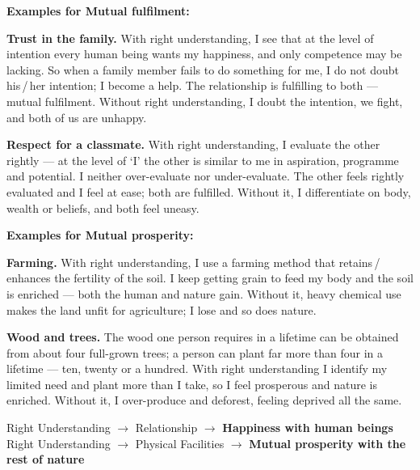 \textbf{Examples for Mutual fulfilment:}
\begin{apts}
\item \textbf{Trust in the family.} With right understanding, I see that at
      the level of intention every human being wants my happiness, and only
      competence may be lacking. So when a family member fails to do something
      for me, I do not doubt his\,/\,her intention; I become a help. The
      relationship is fulfilling to both --- mutual fulfilment. Without right
      understanding, I doubt the intention, we fight, and both of us are
      unhappy.
\item \textbf{Respect for a classmate.} With right understanding, I evaluate
      the other rightly --- at the level of `I' the other is similar to me in
      aspiration, programme and potential. I neither over-evaluate nor
      under-evaluate. The other feels rightly evaluated and I feel at ease;
      both are fulfilled. Without it, I differentiate on body, wealth or
      beliefs, and both feel uneasy.
\end{apts}

\textbf{Examples for Mutual prosperity:}
\begin{apts}
\item \textbf{Farming.} With right understanding, I use a farming method that
      retains\,/\,enhances the fertility of the soil. I keep getting grain to
      feed my body and the soil is enriched --- both the human and nature
      gain. Without it, heavy chemical use makes the land unfit for
      agriculture; I lose and so does nature.
\item \textbf{Wood and trees.} The wood one person requires in a lifetime can
      be obtained from about four full-grown trees; a person can plant far
      more than four in a lifetime --- ten, twenty or a hundred. With right
      understanding I identify my limited need and plant more than I take, so
      I feel prosperous and nature is enriched. Without it, I over-produce and
      deforest, feeling deprived all the same.
\end{apts}

\begin{keybox}
Right Understanding $\rightarrow$ Relationship $\rightarrow$ \textbf{Happiness
with human beings} \hfill \textbar\hfill Right Understanding $\rightarrow$
Physical Facilities $\rightarrow$ \textbf{Mutual prosperity with the rest of
nature}
\end{keybox}


